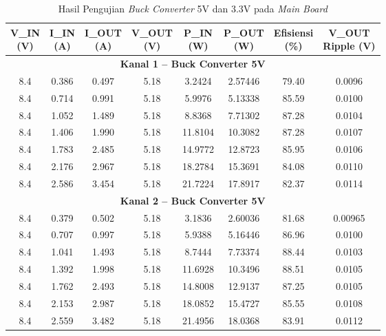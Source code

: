 \begin{table}[H]
\centering
\caption{Hasil Pengujian \emph{Buck Converter} 5V dan 3.3V pada \emph{Main Board}}
\label{tab:buck_mainboard}
\renewcommand{\arraystretch}{1.2}
\setlength{\tabcolsep}{5pt}
\begin{tabular}{cccccccc}
\hline
\makecell{\textbf{V\_IN}\\(V)} & 
\makecell{\textbf{I\_IN}\\(A)} & 
\makecell{\textbf{I\_OUT}\\(A)} & 
\makecell{\textbf{V\_OUT}\\(V)} & 
\makecell{\textbf{P\_IN}\\(W)} & 
\makecell{\textbf{P\_OUT}\\(W)} & 
\makecell{\textbf{Efisiensi}\\(\%)} & 
\makecell{\textbf{V\_OUT}\\\textbf{Ripple (V)}} \\ \hline

\multicolumn{8}{c}{\textbf{Kanal 1 -- Buck Converter 5V}} \\ \hline
8.4 & 0.386 & 0.497 & 5.18 & 3.2424 & 2.57446 & 79.40 & 0.0096 \\
8.4 & 0.714 & 0.991 & 5.18 & 5.9976 & 5.13338 & 85.59 & 0.0100 \\
8.4 & 1.052 & 1.489 & 5.18 & 8.8368 & 7.71302 & 87.28 & 0.0104 \\
8.4 & 1.406 & 1.990 & 5.18 & 11.8104 & 10.3082 & 87.28 & 0.0107 \\
8.4 & 1.783 & 2.485 & 5.18 & 14.9772 & 12.8723 & 85.95 & 0.0106 \\
8.4 & 2.176 & 2.967 & 5.18 & 18.2784 & 15.3691 & 84.08 & 0.0110 \\
8.4 & 2.586 & 3.454 & 5.18 & 21.7224 & 17.8917 & 82.37 & 0.0114 \\ \hline

\multicolumn{8}{c}{\textbf{Kanal 2 -- Buck Converter 5V}} \\ \hline
8.4 & 0.379 & 0.502 & 5.18 & 3.1836 & 2.60036 & 81.68 & 0.00965 \\
8.4 & 0.707 & 0.997 & 5.18 & 5.9388 & 5.16446 & 86.96 & 0.0100 \\
8.4 & 1.041 & 1.493 & 5.18 & 8.7444 & 7.73374 & 88.44 & 0.0103 \\
8.4 & 1.392 & 1.998 & 5.18 & 11.6928 & 10.3496 & 88.51 & 0.0105 \\
8.4 & 1.762 & 2.493 & 5.18 & 14.8008 & 12.9137 & 87.25 & 0.0105 \\
8.4 & 2.153 & 2.987 & 5.18 & 18.0852 & 15.4727 & 85.55 & 0.0108 \\
8.4 & 2.559 & 3.482 & 5.18 & 21.4956 & 18.0368 & 83.91 & 0.0112 \\ \hline


\end{tabular}
\end{table}
